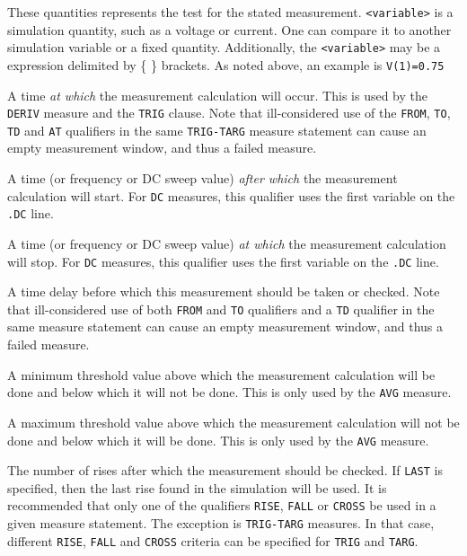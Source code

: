 \begin{Command}
\begin{Arguments}

These quantities represents the test for the stated measurement.  \texttt{<variable>} is
a simulation quantity, such as a voltage or current.  One can compare it
to another simulation variable or a fixed quantity.  Additionally,
the \texttt{<variable>} may be a \Xyce{} expression delimited by \{ \} brackets.  As noted
above, an example is {\tt V(1)=0.75}

A time {\em at which} the measurement calculation will occur.  This is used by
the {\tt DERIV} measure and the {\tt TRIG} clause.  Note that ill-considered use of 
the {\tt FROM}, {\tt TO}, {\tt TD} and {\tt AT} qualifiers in the same 
{\tt TRIG-TARG} measure statement can cause an empty measurement window, 
and thus a failed measure.


A time (or frequency or DC sweep value) {\em after which} the measurement calculation will start.
For {\tt DC} measures, this qualifier uses the first variable on the {\tt .DC} line.  


A time (or frequency or DC sweep value) {\em at which} the measurement calculation will stop.
For {\tt DC} measures, this qualifier uses the first variable on the {\tt .DC} line. 


A time delay before which this measurement should be taken or checked.  Note that 
ill-considered use of both {\tt FROM} and {\tt TO} qualifiers and a {\tt TD} qualifier 
in the same measure statement can cause an empty measurement window, and thus a failed
measure.


A minimum threshold value above which the measurement calculation will
be done and below which it will not be done.  This is only used by the
{\tt AVG} measure.


A maximum threshold value above which the measurement calculation will
not be done and below which it will be done.  This is only used by the
{\tt AVG} measure.


The number of rises after which the measurement should be checked.  If
\texttt{LAST} is specified, then the last rise found in the simulation
will be used.  It is recommended that only one of the qualifiers {\tt RISE}, 
{\tt FALL} or {\tt CROSS} be used in a given measure statement.  The exception 
is {\tt TRIG-TARG} measures.  In that case, different {\tt RISE}, {\tt FALL}
and {\tt CROSS} criteria can be specified for {\tt TRIG} and {\tt TARG}.


\end{Arguments}
\end{Command}
